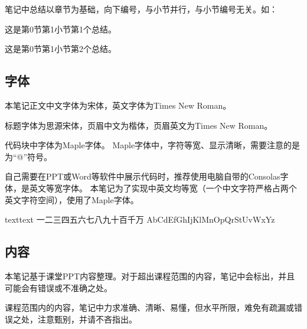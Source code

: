 笔记中总结以章节为基础，向下编号，与小节并行，与小节编号无关。如：
\begin{zj}
这是第0节第1小节第1个总结。
\end{zj}
\begin{zj}
这是第0节第1小节第2个总结。
\end{zj}

\subsection{字体}

本笔记正文中文字体为宋体，英文字体为Times New Roman。

标题字体为思源宋体，页眉中文为楷体，页眉英文为Times New Roman。

代码块中字体为Maple字体。
Maple字体中，字符等宽、显示清晰，需要注意的是为“@”符号。

自己需要在PPT或Word等软件中展示代码时，推荐使用电脑自带的Consolas字体，是英文等宽字体。
本笔记为了实现中英文均等宽（一个中文字符严格占两个英文字符空间），使用了Maple字体。
\begin{envcode}{text}{text}
一二三四五六七八九十百千万
AbCdEfGhIjKlMnOpQrStUvWxYz
\end{envcode}

\subsection{内容}
本笔记基于课堂PPT内容整理。对于超出课程范围的内容，笔记中会标出，并且可能会有错误或不准确之处。

课程范围内的内容，笔记中力求准确、清晰、易懂，但水平所限，难免有疏漏或错误之处，注意甄别，并请不吝指出。